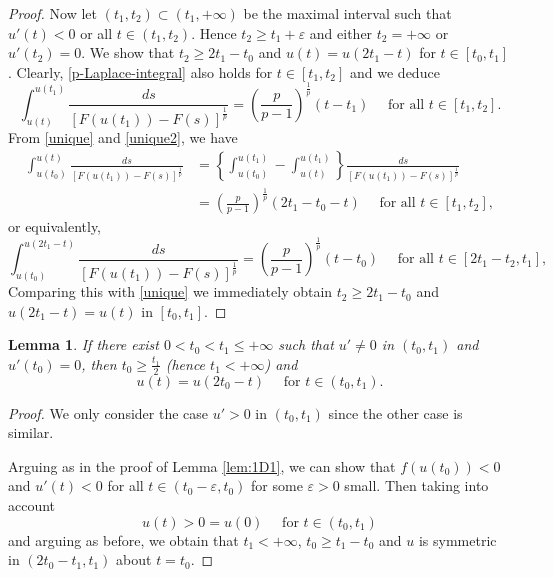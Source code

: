 \documentclass[reqno]{amsart}
\theoremstyle{plain}
\newtheorem{lemma}[theorem]{Lemma}
\theoremstyle{definition}
\theoremstyle{remark}
\begin{document}
\begin{proof}
		Now let $(t_1,t_2)\subset(t_1,+\infty)$ be the maximal interval such that $u'(t)<0$ or all $t\in(t_1,t_2)$. Hence $t_2\ge t_1+\varepsilon$ and either $t_2=+\infty$ or $u'(t_2)=0$. We show that $t_2\ge2t_1-t_0$ and $u(t)=u(2t_1-t)$ for $t\in [t_0,t_1]$. Clearly, \eqref{p-Laplace-integral} also holds for $t\in[t_1, t_2]$ and we deduce
		\begin{equation}\label{unique2}
			\int_{u(t)}^{u(t_1)} \frac{ds}{\left[F(u(t_1))-F(s)\right]^\frac{1}{p}} = \left(\frac{p}{p-1}\right)^\frac{1}{p}(t-t_1) \quad\text{ for all } t\in[t_1,t_2].
		\end{equation}
		From \eqref{unique} and \eqref{unique2}, we have
		\begin{align*}
			\int_{u(t_0)}^{u(t)} \frac{ds}{\left[F(u(t_1))-F(s)\right]^\frac{1}{p}} &= \left\{\int_{u(t_0)}^{u(t_1)} - \int_{u(t)}^{u(t_1)}\right\} \frac{ds}{\left[F(u(t_1))-F(s)\right]^\frac{1}{p}}\\
			&= \left(\frac{p}{p-1}\right)^\frac{1}{p}(2t_1-t_0-t) \quad\text{ for all } t\in[t_1,t_2],
		\end{align*}
		or equivalently,
		\[
		\int_{u(t_0)}^{u(2t_1-t)} \frac{ds}{\left[F(u(t_1))-F(s)\right]^\frac{1}{p}} = \left(\frac{p}{p-1}\right)^\frac{1}{p}(t-t_0) \quad\text{ for all } t\in[2t_1-t_2, t_1],
		\]
		Comparing this with \eqref{unique} we immediately obtain $t_2\ge2t_1-t_0$ and $u(2t_1 - t) = u(t)$ in $[t_0, t_1]$.
	\end{proof}
	
	\begin{lemma}\label{lem:1D2}
		If there exist $0< t_0<t_1\le+\infty$ such that $u' \ne 0$ in $(t_0, t_1)$ and $u'(t_0)=0$, then $t_0\ge\frac{t_1}{2}$ (hence $t_1<+\infty$) and
		\[
		u(t) = u(2t_0-t) \quad\text{ for } t\in(t_0, t_1).
		\]
	\end{lemma}
	
	\begin{proof}
		We only consider the case $u' > 0$ in $(t_0, t_1)$ since the other case is similar.
		
		Arguing as in the proof of Lemma \ref{lem:1D1}, we can show that $f(u(t_0))<0$ and $u'(t)<0$ for all $t\in(t_0-\varepsilon,t_0)$ for some $\varepsilon>0$ small. Then taking into account
		\[
		u(t) > 0 = u(0) \quad\text{ for } t\in(t_0,t_1)
		\]
		and arguing as before, we obtain that $t_1<+\infty$, $t_0\ge t_1-t_0$ and $u$ is symmetric in $(2t_0-t_1, t_1)$ about $t=t_0$.
	\end{proof}
	
\end{document}

